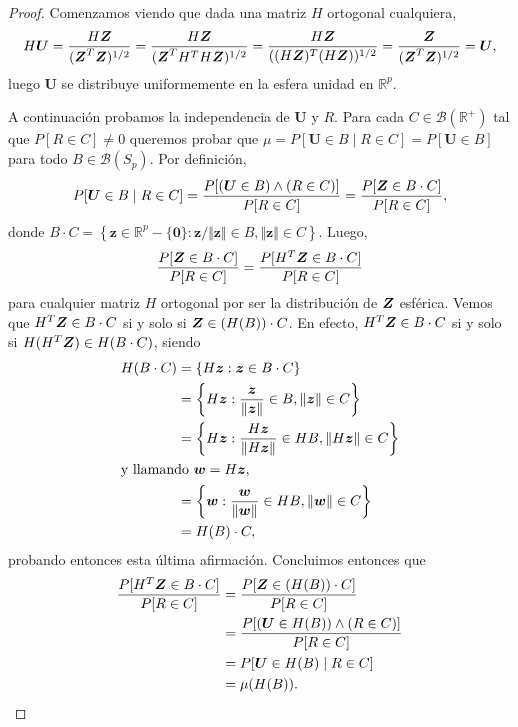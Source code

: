 \begin{proof}
  Comenzamos viendo que dada una matriz $H$ ortogonal cualquiera,
  \begin{align*}
    H\boldsymbol U = \frac{H\boldsymbol{Z}}{(\boldsymbol{Z}^T\boldsymbol{Z})^{1/2}}
      = \frac{H\boldsymbol{Z}}{(\boldsymbol{Z}^TH^TH\boldsymbol{Z})^{1/2}}
      = \frac{H\boldsymbol{Z}}{((H\boldsymbol{Z})^T(H\boldsymbol{Z}))^{1/2}}
      = \frac{\boldsymbol{Z}}{(\boldsymbol{Z}^T\boldsymbol{Z})^{1/2}}
      = \boldsymbol U,
  \end{align*} luego $\boldsymbol U$ se distribuye uniformemente en la esfera unidad en $\mathbb R^p$.

  A continuación probamos la independencia de $\boldsymbol U$ y $R$. Para cada $C \in \mathcal B(\mathbb R^+)$ tal que $P[R \in C] \neq 0$ queremos probar que $\mu = P[\boldsymbol U \in B \mid R \in C] = P[\boldsymbol U \in B]$ para todo $B \in \mathcal B(S_p)$.
  Por definición, \begin{align*}
    P[\boldsymbol U \in B \mid R \in C] 
    = \frac{P[(\boldsymbol U \in B) \land (R \in C)]}{P[R \in C]} 
    = \frac{P[\boldsymbol{Z} \in B \cdot C]}{P[R \in C]},
  \end{align*} 
  donde $B \cdot C = \left\{\boldsymbol z \in \mathbb R^p - \{\boldsymbol 0\} : \boldsymbol z/\Vert \boldsymbol z \Vert \in B, \Vert \boldsymbol z \Vert \in C\right\}$. 
  Luego, \begin{align*}
    \frac{P[\boldsymbol{Z} \in B \cdot C]}{P[R \in C]} = \frac{P[H^T\boldsymbol{Z} \in B \cdot C]}{P[R \in C]}
  \end{align*} para cualquier matriz $H$ ortogonal por ser la distribución de $\boldsymbol{Z}$ esférica. 
  Vemos que $H^T\boldsymbol{Z} \in B \cdot C$ si y solo si $\boldsymbol{Z} \in (H(B)) \cdot C$. En efecto, $H^T\boldsymbol{Z} \in B \cdot C$ si y solo si $H(H^T\boldsymbol{Z}) \in H(B \cdot C)$, siendo \begin{align*}
    H(B\cdot C) &= \left\{H \boldsymbol z : \boldsymbol z \in B \cdot C\right\}\\
      &= \left\{H \boldsymbol z : \frac{\boldsymbol z}{\Vert \boldsymbol z \Vert} \in B, \Vert \boldsymbol z \Vert \in C\right\} \\
      &= \left\{H \boldsymbol z : \frac{H \boldsymbol z}{\Vert H \boldsymbol z\Vert} \in HB, \Vert H\boldsymbol z\Vert \in C\right\}\\
      \shortintertext{y llamando $\boldsymbol w = H\boldsymbol z$,}
      &= \left\{\boldsymbol w : \frac{\boldsymbol w}{\Vert \boldsymbol w\Vert} \in HB, \Vert \boldsymbol w\Vert \in C\right\}\\
      &= H(B) \cdot C,
  \end{align*} probando entonces esta última afirmación.
  Concluimos entonces que \begin{align*}
    \frac{P[H^T\boldsymbol{Z} \in B \cdot C]}{P[R \in C]} &= \frac{P[\boldsymbol{Z} \in (H(B)) \cdot C]}{P[R \in C]}\\
      &= \frac{P[(\boldsymbol U \in H(B)) \land (R \in C)]}{P[R \in C]} \\
      &= P[\boldsymbol U \in H(B) \mid R \in C] \\
      &= \mu(H(B)).
  \end{align*}
\end{proof}

